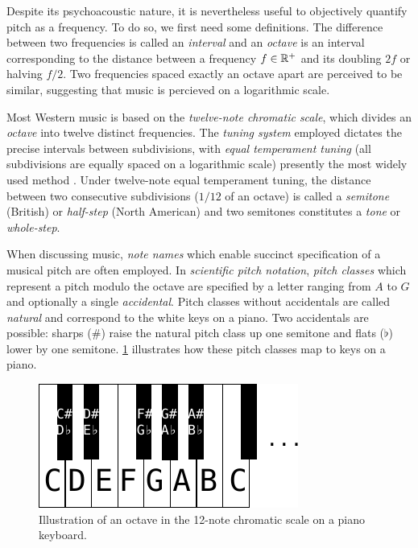 Despite its psychoacoustic nature, it is nevertheless useful to objectively
quantify pitch as a frequency. To do so, we first need some definitions. The
difference between two frequencies is called an \emph{interval} and an
\emph{octave} is an interval corresponding to the distance between a frequency
$f \in \mathbb{R}^+$ and its doubling $2f$ or halving $f/2$. Two frequencies spaced
exactly an octave apart are perceived to be similar, suggesting that music is
percieved on a logarithmic scale.

Most Western music is based on the \emph{twelve-note chromatic scale}, which
divides an \emph{octave} into twelve distinct frequencies. The \emph{tuning
system} employed dictates the precise intervals between subdivisions, with
\emph{equal temperament tuning} (all subdivisions are equally spaced on a
logarithmic scale) presently the most widely used
method \citep{denton1997history}. 
Under twelve-note equal temperament tuning, the distance between two
consecutive subdivisions ($1/12$ of an octave) is called a \emph{semitone}
(British) or \emph{half-step} (North American) and two semitones constitutes
a \emph{tone} or \emph{whole-step}.

When discussing music, \emph{note names} which enable succinct specification of
a musical pitch are often employed. In \emph{scientific pitch notation},
\emph{pitch classes} which represent a pitch modulo the octave are specified by
a letter ranging from $A$ to $G$ and optionally a single \emph{accidental}. Pitch
classes without accidentals are called \emph{natural} and correspond to the white
keys on a piano. Two accidentals are possible: sharps ($\#$) raise the natural
pitch class up one semitone and flats ($\flat$) lower by one semitone.
\cref{fig:piano-keys} illustrates how these pitch classes map to keys on a
piano.

\begin{figure}[htpb]
    \centering
    \includegraphics[width=0.6\linewidth]{piano-keys.pdf}
    \caption{Illustration of an octave in the 12-note chromatic scale on a piano keyboard.}
    \label{fig:piano-keys}
\end{figure}

